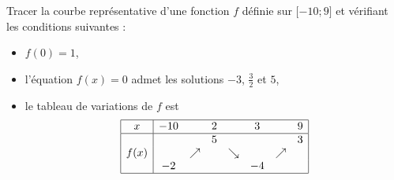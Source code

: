 
\begin{exercice}%
    \label{exosmath-0319}

    Tracer la courbe représentative d'une fonction \( f\) définie sur \( \mathopen[ -10 ;9 \mathclose]\) et vérifiant les conditions suivantes :
    \begin{itemize}
        \item 
            \( f(0)=1\),
        \item
            l'équation \( f(x)=0\) admet les solutions \( -3\), \( \frac{ 3 }{2}\) et \( 5\),
        \item
            le tableau de variations de \( f\) est
            \begin{equation*}
                \begin{array}[]{|c|ccccccc|}
                    \hline
                    x&-10&&2&&3&&9\\
                    \hline
                    &&&5&&&&3\\
                    f(x)&&\nearrow&&\searrow&&\nearrow&\\
                    &-2&&&&-4&&\\
                    \hline
                \end{array}
            \end{equation*}
    \end{itemize}

\end{exercice}
